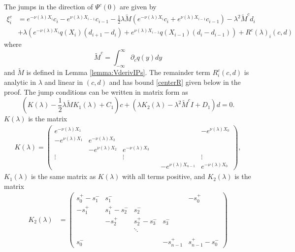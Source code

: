 \documentclass[thesis.tex]{subfiles}
\begin{document}
\begin{lemma}\label{jumpcenteradj}
The jumps in the direction of $\Psi^c(0)$ are given by
\begin{equation}\label{xic}
\begin{aligned}
\xi^c_i &= e^{-\nu(\lambda) X_i} c_i - e^{\nu(\lambda) X_{i-1}} c_{i-1} - \frac{1}{2} \lambda \tilde{M}( e^{-\nu(\lambda) X_i} c_i + e^{\nu(\lambda) X_{i-1}} c_{i-1} )
- \lambda^2 \tilde{M}^c d_i\\
&+ \lambda \left( e^{-\nu(\lambda)X_i} q(X_i) (d_{i+1} - d_i ) + e^{\nu(\lambda)X_{i-1}} q(X_{i-1}) (d_i - d_{i-1} )\right) + R^c(\lambda)_i(c, d)
\end{aligned}
\end{equation}
where
\[
\tilde{M}^c = \int_{-\infty}^\infty \partial_c q(y) dy
\]
and $\tilde{M}$ is defined in Lemma \ref{lemma:VderivIPs}. The remainder term $R^c_i(c, d)$ is analytic in $\lambda$ and linear in $(c, d)$ and has bound \cref{centerR} given below in the proof. The jump conditions can be written in matrix form as
\begin{equation}\label{matrixjumpc}
\left( K(\lambda) - \frac{1}{2} \lambda \tilde{M} K_1(\lambda) + C_1 \right) c + (\lambda K_2(\lambda) - \lambda^2 \tilde{M}^c I + D_1) d = 0.
\end{equation}
$K(\lambda)$ is the matrix
\begin{align*}
K(\lambda) =  
\begin{pmatrix}
e^{-\nu(\lambda)X_1} & & & & & -e^{\nu(\lambda)X_0} \\
-e^{\nu(\lambda)X_1} & e^{-\nu(\lambda)X_2} \\
& -e^{\nu(\lambda)X_2} & e^{-\nu(\lambda)X_3} \\
\vdots & & \vdots & &&  \vdots \\
& & & & -e^{\nu(\lambda)X_{n-1}} & e^{-\nu(\lambda)X_0}
\end{pmatrix},
\end{align*}
$K_1(\lambda)$ is the same matrix as $K(\lambda)$ with all terms positive, and $K_2(\lambda)$ is the matrix
\begin{align*}
K_2(\lambda) &= \begin{pmatrix}
s_0^+ - s_1^- & s_1^- &&& -s_0^+ \\
-s_1^+ & s_1^+ - s_2^- & s_2^- \\
& -s_2^+ & s_2^+ - s_3^- & s_3^- \\ && \ddots \\
\\
s_0^- &&& -s_{n-1}^+ & s_{n-1}^+ - s_0^- 

\end{pmatrix}
\end{align*}
\end{lemma}
\end{document}
